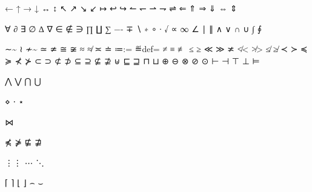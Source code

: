 ←\leftarrow  %
↑\uparrow    %
→\rightarrow %
↓\downarrow  %
↔\leftrightarrow %
↕\updownarrow    %
↖\nwarrow %
↗\nearrow %
↘\searrow %
↙\swarrow %
↦\mapsto %
↩\hookleftarrow  %
↪\hookrightarrow %
↼\leftharpoonup     %
↽\leftharpoondown   %
⇀\rightharpoonup    %
⇁\rightharpoondown  %
⇌\rightleftharpoons %
⇐\Leftarrow      %
⇑\Uparrow        %
⇒\Rightarrow     %
⇓\Downarrow      %
⇔\Leftrightarrow %
⇕\Updownarrow    %

∀\forall   %
∂\partial  %
∃\exists   %
∅\emptyset %
∆\triangle %
∇\nabla    %
∈\in    %
∉\notin %
∋\ni    %
∏\prod   %
∐\coprod %
∑\sum    %
−-    %
∓\mp  %
∖\setminus %
∗\ast      %
∘\circ     %
∙\bullet   %
√\surd     %
∝\propto %
∞\infty %
∠\angle %
∣\mid      %
∥\parallel %
∧\wedge %
∨\vee   %
∩\cap   %
∪\cup   %
∫\int  %
∮\oint %

∼\sim %
≀\wr %
≁{\not\sim}   %
≃\simeq %
≄{\not\simeq} %
≅\cong %
≆{\not\cong} %
≈\approx %
≉{\not\approx} %
≍\asymp %
≐\doteq %
≔{:=} %
≝{\buildrel\rm def\over=} %
≠\neq %
≡\equiv %
≢{\not\equiv} %
≤\leq %
≥\geq %
≪\ll %
≫\gg %
≭{\not\asymp} %
≮{\not<}    %
≯{\not>}    %
≰{\not\leq} %
≱{\not\geq} %
≺\prec %
≻\succ %
≼\preceq %
≽\succeq %
⊀{\not\prec} %
⊁{\not\succ} %
⊂\subset %
⊃\supset %
⊄{\not\subset} %
⊅{\not\supset} %
⊆\subseteq %
⊇\supseteq %
⊈{\not\subseteq} %
⊉{\not\supseteq} %
⊎\uplus %
⊑\sqsubseteq %
⊒\sqsupseteq %
⊓\sqcap %
⊔\sqcup %
⊕\oplus  %
⊖\ominus %
⊗\otimes %
⊘\oslash %
⊙\odot   %
⊢\vdash %
⊣\dashv %
⊤\top %
⊥\bot %
⊨\models %

⋀\bigwedge %
⋁\bigvee   %
⋂\bigcap   %
⋃\bigcup   %

⋄\diamond %
⋅\cdot    %
⋆\star    %

⋈\bowtie %

⋠{\not\preceq} %
⋡{\not\succeq} %
⋢{\not\sqsubseteq} %
⋣{\not\sqsupseteq} %

⋮\vdots %
⋯\cdots %
⋱\ddots %

⌈\lceil  %
⌉\rceil  %
⌊\lfloor %
⌋\rfloor %
⌢\frown %
⌣\smile %

